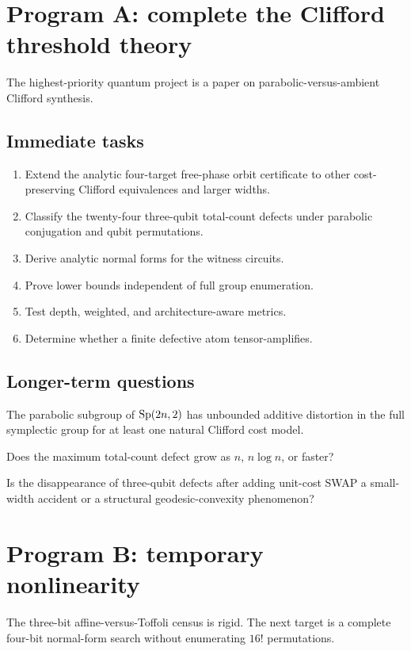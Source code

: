 \section{Program A: complete the Clifford threshold theory}
The highest-priority quantum project is a paper on parabolic-versus-ambient Clifford synthesis.

\subsection{Immediate tasks}
\begin{enumerate}
\item Extend the analytic four-target free-phase orbit certificate to other cost-preserving Clifford equivalences and larger widths.
\item Classify the twenty-four three-qubit total-count defects under parabolic conjugation and qubit permutations.
\item Derive analytic normal forms for the witness circuits.
\item Prove lower bounds independent of full group enumeration.
\item Test depth, weighted, and architecture-aware metrics.
\item Determine whether a finite defective atom tensor-amplifies.
\end{enumerate}

\subsection{Longer-term questions}
\begin{conjecture}
The parabolic subgroup of $\operatorname{Sp}(2n,2)$ has unbounded additive distortion in the full symplectic group for at least one natural Clifford cost model.
\end{conjecture}
\begin{question}
Does the maximum total-count defect grow as $n$, $n\log n$, or faster?
\end{question}
\begin{question}
Is the disappearance of three-qubit defects after adding unit-cost SWAP a small-width accident or a structural geodesic-convexity phenomenon?
\end{question}

\section{Program B: temporary nonlinearity}
The three-bit affine-versus-Toffoli census is rigid.  The next target is a complete four-bit normal-form search without enumerating $16!$ permutations.


